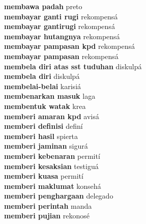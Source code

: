 \textbf{ membawa padah  } preto \\
\textbf{ membayar ganti rugi  } rekompensá \\
\textbf{ membayar gantirugi  } rekompensá \\
\textbf{ membayar hutangnya  } rekompensá \\
\textbf{ membayar pampasan kpd  } rekompensá \\
\textbf{ membayar pampasan  } rekompensá \\
\textbf{ membela diri  atas sst tuduhan  } diskulpá \\
\textbf{ membela diri  } diskulpá \\
\textbf{ membelai-belai  } karisiá \\
\textbf{ membenarkan masuk  } laga \\
\textbf{ membentuk watak  } krea \\
\textbf{ memberi amaran kpd  } avisá \\
\textbf{ memberi definisi  } definí \\
\textbf{ memberi hasil  } spierta \\
\textbf{ memberi jaminan  } sigurá \\
\textbf{ memberi kebenaran  } permití \\
\textbf{ memberi kesaksian  } testiguá \\
\textbf{ memberi kuasa  } permití \\
\textbf{ memberi maklumat  } konsehá \\
\textbf{ memberi penghargaan  } delegado \\
\textbf{ memberi perintah  } manda \\
\textbf{ memberi pujian  } rekonosé \\
